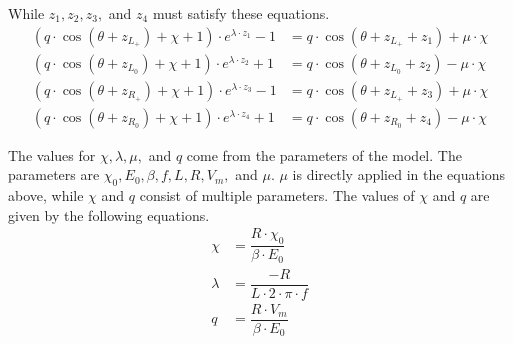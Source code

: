While $z_1, z_2, z_3,$ and $z_4$ must satisfy these equations.
\begin{subequations}
    \begin{align}
        (q \cdot \cos(\theta + z_{L_+}) + \chi + 1) \cdot e^{\lambda \cdot z_1} - 1
         & = q \cdot  \cos(\theta + z_{L_+} + z_1) + \mu \cdot \chi \\
        (q \cdot \cos(\theta + z_{L_0}) + \chi + 1) \cdot e^{\lambda \cdot z_2} + 1
         & = q \cdot  \cos(\theta + z_{L_0} + z_2) - \mu \cdot \chi \\
        (q \cdot \cos(\theta + z_{R_+}) + \chi + 1) \cdot e^{\lambda \cdot z_3} - 1
         & = q \cdot  \cos(\theta + z_{L_+} + z_3) + \mu \cdot \chi \\
        (q \cdot \cos(\theta + z_{R_0}) + \chi + 1) \cdot e^{\lambda \cdot z_4} + 1
         & = q \cdot  \cos(\theta + z_{R_0} + z_4) - \mu \cdot \chi
    \end{align}
\end{subequations}


The values for $\chi, \lambda, \mu,$ and $q$ come from the parameters of the model.
The parameters are $\chi_0, E_0, \beta, f, L, R, V_m,$ and $\mu$.
$\mu$ is directly applied in the equations above, while $\chi$ and $q$ consist of multiple parameters.
The values of $\chi$ and $q$ are given by the following equations.
\begin{align}
    \chi    & = \dfrac{R \cdot \chi_0}{\beta \cdot E_0} \\
    \lambda & = \dfrac{-R}{L \cdot 2 \cdot \pi \cdot f} \\
    q       & = \dfrac{R \cdot V_m}{\beta \cdot E_0}
\end{align}
